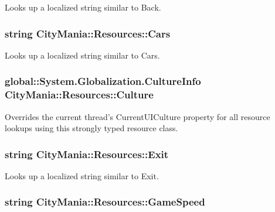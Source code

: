 Looks up a localized string similar to Back. \hypertarget{classCityMania_1_1Resources_a933437ce6fc05a82924f3d601b1317dd}{
\subsubsection[{Cars}]{\setlength{\rightskip}{0pt plus 5cm}string CityMania::Resources::Cars}}
\label{classCityMania_1_1Resources_a933437ce6fc05a82924f3d601b1317dd}


Looks up a localized string similar to Cars. \hypertarget{classCityMania_1_1Resources_a218d1275037fd80512950b4f196d2899}{
\subsubsection[{Culture}]{\setlength{\rightskip}{0pt plus 5cm}global::System.Globalization.CultureInfo CityMania::Resources::Culture}}
\label{classCityMania_1_1Resources_a218d1275037fd80512950b4f196d2899}


Overrides the current thread's CurrentUICulture property for all resource lookups using this strongly typed resource class. \hypertarget{classCityMania_1_1Resources_a6d9e6171c2c0a42a4c301065e5ef83bc}{
\subsubsection[{Exit}]{\setlength{\rightskip}{0pt plus 5cm}string CityMania::Resources::Exit}}
\label{classCityMania_1_1Resources_a6d9e6171c2c0a42a4c301065e5ef83bc}


Looks up a localized string similar to Exit. \hypertarget{classCityMania_1_1Resources_aafcdfc87a91a665407051a77ce79aa3e}{
\subsubsection[{GameSpeed}]{\setlength{\rightskip}{0pt plus 5cm}string CityMania::Resources::GameSpeed}}
\label{classCityMania_1_1Resources_aafcdfc87a91a665407051a77ce79aa3e}


